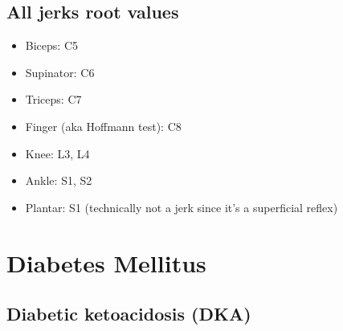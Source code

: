 \documentclass[
  12pt,
]{memoir}
\providecommand{\tightlist}{%
  \setlength{\itemsep}{0pt}\setlength{\parskip}{0pt}}
\begin{document}
\hypertarget{all-jerks-root-values}{%
\section{All jerks root values}\label{all-jerks-root-values}}

\begin{itemize}
\tightlist
\item
  Biceps: C5
\item
  Supinator: C6
\item
  Triceps: C7
\item
  Finger (aka Hoffmann test): C8
\item
  Knee: L3, L4
\item
  Ankle: S1, S2
\item
  Plantar: S1 (technically not a jerk since it's a superficial reflex)
\end{itemize}

\pagebreak

\hypertarget{diabetes-mellitus}{%
\chapter{Diabetes Mellitus}\label{diabetes-mellitus}}

\hypertarget{diabetic-ketoacidosis-dka}{%
\section{Diabetic ketoacidosis (DKA)}\label{diabetic-ketoacidosis-dka}}
\end{document}
